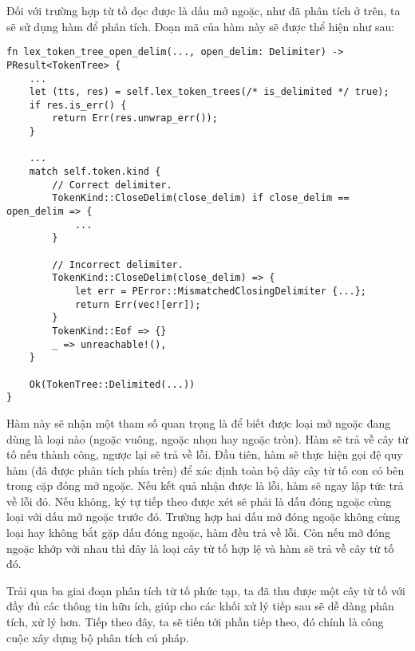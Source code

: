     Đối với trường hợp từ tố đọc được là dấu mở ngoặc, như đã phân tích ở trên, ta sẽ sử dụng hàm  để phân tích. Đoạn mã của hàm này sẽ được thể hiện như sau:

\begin{lstlisting}[]
fn lex_token_tree_open_delim(..., open_delim: Delimiter) -> PResult<TokenTree> {
    ...
    let (tts, res) = self.lex_token_trees(/* is_delimited */ true);
    if res.is_err() {
        return Err(res.unwrap_err());
    }

    ...
    match self.token.kind {
        // Correct delimiter.
        TokenKind::CloseDelim(close_delim) if close_delim == open_delim => {
            ...
        }

        // Incorrect delimiter.
        TokenKind::CloseDelim(close_delim) => {
            let err = PError::MismatchedClosingDelimiter {...};
            return Err(vec![err]);
        }
        TokenKind::Eof => {}
        _ => unreachable!(),
    }

    Ok(TokenTree::Delimited(...))
}
\end{lstlisting}

    Hàm này sẽ nhận một tham số quan trọng là  để biết được loại mở ngoặc đang dùng là loại nào (ngoặc vuông, ngoặc nhọn hay ngoặc tròn). Hàm sẽ trả về cây từ tố nếu thành công, ngược lại sẽ trả về lỗi. Đầu tiên, hàm sẽ thực hiện gọi đệ quy hàm  (đã được phân tích phía trên) để xác định toàn bộ dãy cây từ tố con có bên trong cặp đóng mở ngoặc. Nếu kết quả nhận được là lỗi, hàm sẽ ngay lập tức trả về lỗi đó. Nếu không, ký tự tiếp theo được xét sẽ phải là dấu đóng ngoặc cùng loại với dấu mở ngoặc trước đó. Trường hợp hai dấu mở đóng ngoặc không cùng loại hay không bắt gặp dấu đóng ngoặc, hàm đều trả về lỗi. Còn nếu mở đóng ngoặc khớp với nhau thì đây là loại cây từ tố  hợp lệ và hàm sẽ trả về cây từ tố đó.

    Trải qua ba giai đoạn phân tích từ tố phức tạp, ta đã thu được một cây từ tố với đầy đủ các thông tin hữu ích, giúp cho các khối xử lý tiếp sau sẽ dễ dàng phân tích, xử lý hơn. Tiếp theo đây, ta sẽ tiến tới phần tiếp theo, đó chính là công cuộc xây dựng bộ phân tích cú pháp.
